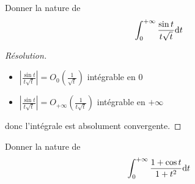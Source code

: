 \begin{exo}
    Donner la nature de \[
        \int_0^{+\infty}\frac{\sin t}{t\sqrt t}\mathrm{d} t
    \]
\end{exo}

\begin{proof}[Résolution]~
    \begin{itemize}
        \item $\displaystyle \left| \frac{\sin t}{t\sqrt t} \right|=O_0 \left( \frac1{\sqrt t} \right)$ intégrable en $0$
        \item $\displaystyle \left| \frac{\sin t}{t\sqrt t} \right|=O_{+\infty} \left( \frac1{t\sqrt t} \right)$ intégrable en $+\infty$
    \end{itemize}
    donc l'intégrale est absolument convergente.
\end{proof}

\begin{exo}
    Donner la nature de \[
        \int_0^{+\infty}\frac{1+\cos t}{1+t^2}\mathrm{d} t
    \]
\end{exo}
